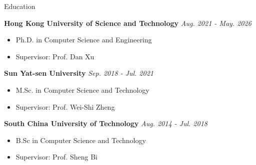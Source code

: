 \documentclass{resume} %
\begin{document}

\begin{rSection}{Education}

{\bf Hong Kong University of Science and Technology} \hfill {\em Aug. 2021 - May. 2026}
\vspace{-3pt}
\begin{itemize}[leftmargin=18pt]
    \setlength{\itemsep}{-5pt}
    \item Ph.D. in Computer Science and Engineering
    \item Supervisor: Prof. Dan Xu
\end{itemize}

{\bf Sun Yat-sen University} \hfill {\em Sep. 2018 - Jul. 2021}
\vspace{-3pt}
\begin{itemize}[leftmargin=18pt]
    \setlength{\itemsep}{-5pt}
    \item M.Sc. in Computer Science and Technology
    \item Supervisor: Prof. Wei-Shi Zheng
\end{itemize}

{\bf South China University of Technology} \hfill {\em Aug. 2014 - Jul. 2018}
\vspace{-3pt}
\begin{itemize}[leftmargin=18pt]
    \setlength{\itemsep}{-5pt}
    \item B.Sc in Computer Science and Technology
    \item Supervisor: Prof. Sheng Bi
\end{itemize}

\end{rSection}
\end{document}
